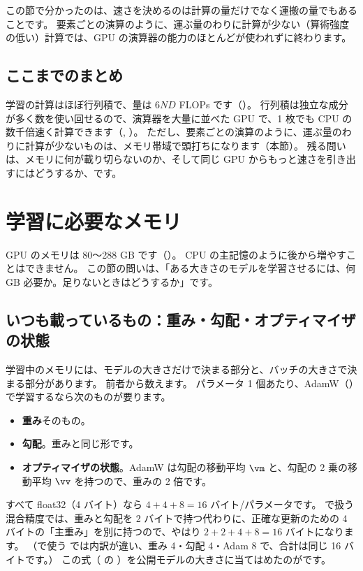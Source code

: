 この節で分かったのは、速さを決めるのは計算の量だけでなく運搬の量でもあることです。
要素ごとの演算のように、運ぶ量のわりに計算が少ない（算術強度の低い）計算では、GPU の演算器の能力のほとんどが使われずに終わります。

\subsection*{ここまでのまとめ}
学習の計算はほぼ行列積で、量は $6ND$ FLOPs です（）。
行列積は独立な成分が多く数を使い回せるので、演算器を大量に並べた GPU で、1 枚でも CPU の数千倍速く計算できます（, ）。
ただし、要素ごとの演算のように、運ぶ量のわりに計算が少ないものは、メモリ帯域で頭打ちになります（本節）。
残る問いは、メモリに何が載り切らないのか、そして同じ GPU からもっと速さを引き出すにはどうするか、です。

\section{学習に必要なメモリ}\label{sec:gpu-memory}

GPU のメモリは 80〜288 GB です（）。
CPU の主記憶のように後から増やすことはできません。
この節の問いは、「ある大きさのモデルを学習させるには、何 GB 必要か。足りないときはどうするか」です。

\subsection*{いつも載っているもの：重み・勾配・オプティマイザの状態}

学習中のメモリには、モデルの大きさだけで決まる部分と、バッチの大きさで決まる部分があります。
前者から数えます。
パラメータ 1 個あたり、AdamW（）で学習するなら次のものが要ります。
\begin{itemize}
\item \textbf{重み}そのもの。
\item \textbf{勾配}。重みと同じ形です。
\item \textbf{オプティマイザの状態}。AdamW は勾配の移動平均 $\vm$ と、勾配の 2 乗の移動平均 $\vv$ を持つので、重みの 2 倍です。
\end{itemize}
すべて float32（4 バイト）なら $4+4+8=16$ バイト/パラメータです。
で扱う混合精度では、重みと勾配を 2 バイトで持つ代わりに、正確な更新のための 4 バイトの「主重み」を別に持つので、やはり $2+2+4+8=16$ バイトになります\cite{rajbhandari2020zero}。
（で使う  では内訳が違い、重み 4・勾配 4・Adam 8 で、合計は同じ 16 バイトです。）
この式（ の ）を公開モデルの大きさに当てはめたのがです。

